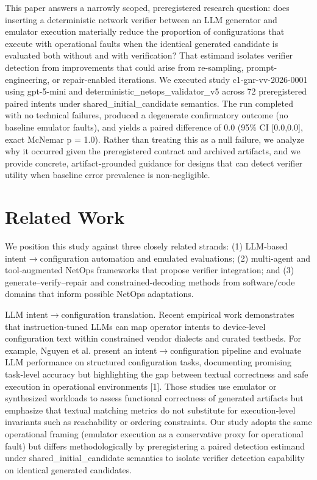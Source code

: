 \documentclass[conference]{IEEEtran}
\begin{document}
This paper answers a narrowly scoped, preregistered research question: does inserting a deterministic network verifier between an LLM generator and emulator execution materially reduce the proportion of configurations that execute with operational faults when the identical generated candidate is evaluated both without and with verification? That estimand isolates verifier detection from improvements that could arise from re-sampling, prompt-engineering, or repair-enabled iterations. We executed study c1-gnr-vv-2026-0001 using gpt-5-mini and deterministic\_netops\_validator\_v5 across 72 preregistered paired intents under shared\_initial\_candidate semantics. The run completed with no technical failures, produced a degenerate confirmatory outcome (no baseline emulator faults), and yields a paired difference of 0.0 (95\% CI [0.0,0.0], exact McNemar p = 1.0). Rather than treating this as a null failure, we analyze why it occurred given the preregistered contract and archived artifacts, and we provide concrete, artifact-grounded guidance for designs that can detect verifier utility when baseline error prevalence is non-negligible.

\section{Related Work}
We position this study against three closely related strands: (1) LLM‑based intent\ensuremath{\rightarrow}configuration automation and emulated evaluations; (2) multi-agent and tool‑augmented NetOps frameworks that propose verifier integration; and (3) generate--verify--repair and constrained‑decoding methods from software/code domains that inform possible NetOps adaptations.

LLM intent\ensuremath{\rightarrow}configuration translation. Recent empirical work demonstrates that instruction‑tuned LLMs can map operator intents to device‑level configuration text within constrained vendor dialects and curated testbeds. For example, Nguyen et al. present an intent\ensuremath{\rightarrow}configuration pipeline and evaluate LLM performance on structured configuration tasks, documenting promising task‑level accuracy but highlighting the gap between textual correctness and safe execution in operational environments [1]. Those studies use emulator or synthesized workloads to assess functional correctness of generated artifacts but emphasize that textual matching metrics do not substitute for execution‑level invariants such as reachability or ordering constraints. Our study adopts the same operational framing (emulator execution as a conservative proxy for operational fault) but differs methodologically by preregistering a paired detection estimand under shared\_initial\_candidate semantics to isolate verifier detection capability on identical generated candidates.
\end{document}
